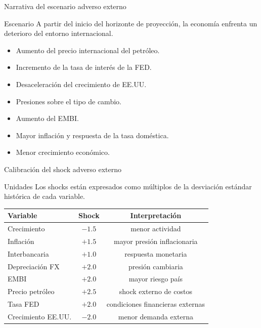 \begin{frame}{Narrativa del escenario adverso externo}

\begin{block}{Escenario}
A partir del inicio del horizonte de proyección, la economía enfrenta un deterioro del entorno internacional.
\end{block}

\begin{itemize}
    \item Aumento del precio internacional del petróleo.
    \item Incremento de la tasa de interés de la FED.
    \item Desaceleración del crecimiento de EE.UU.
    \item Presiones sobre el tipo de cambio.
    \item Aumento del EMBI.
    \item Mayor inflación y respuesta de la tasa doméstica.
    \item Menor crecimiento económico.
\end{itemize}

\end{frame}

\begin{frame}{Calibración del shock adverso externo}

\begin{block}{Unidades}
Los shocks están expresados como múltiplos de la desviación estándar histórica de cada variable.
\end{block}

\begin{table}
\centering
\small
\begin{tabular}{lcc}
\toprule
Variable & Shock & Interpretación \\
\midrule
Crecimiento & $-1.5$ & menor actividad \\
Inflación & $+1.5$ & mayor presión inflacionaria \\
Interbancaria & $+1.0$ & respuesta monetaria \\
Depreciación FX & $+2.0$ & presión cambiaria \\
EMBI & $+2.0$ & mayor riesgo país \\
Precio petróleo & $+2.5$ & shock externo de costos \\
Tasa FED & $+2.0$ & condiciones financieras externas \\
Crecimiento EE.UU. & $-2.0$ & menor demanda externa \\
\bottomrule
\end{tabular}
\end{table}

\end{frame}

